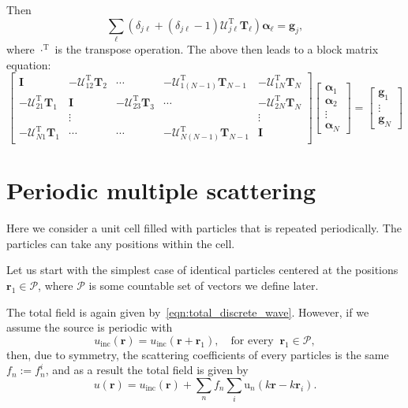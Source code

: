 \documentclass[ 12pt, a4paper]{article}
\renewcommand{\vec}[1]{\boldsymbol{#1}}
\begin{document}
 Then
\begin{equation}
 \sum_{\ell}(\delta_{j \ell} +  (\delta_{j \ell}-1) \vec {\mathcal U}_{j \ell}^{\mathrm T} \vec T_\ell) \vec \alpha_\ell  =  \vec g_j,
\end{equation}
where $\cdot ^{\mathrm T}$ is the transpose operation. The above then leads to a block matrix equation:
\begin{equation}
  \begin{bmatrix}
    \vec I & - \vec {\mathcal U}_{1 2}^{\mathrm T}\vec T_2 & \cdots & - \vec {\mathcal U}_{1 (N-1)}^{\mathrm T} \vec T_{N-1} & - \vec {\mathcal U}_{1 N}^{\mathrm T} \vec T_N \\
    - \vec {\mathcal U}_{2 1}^{\mathrm T} \vec T_1 & \vec I &  - \vec {\mathcal U}_{2 3}^{\mathrm T} \vec T_3 & \cdots & - \vec {\mathcal U}_{2 N}^{\mathrm T} \vec T_N \\
     & \vdots & & & \vdots \\
     - \vec {\mathcal U}_{N 1}^{\mathrm T} \vec T_1  & \cdots & \cdots & -  \vec {\mathcal U}_{N (N-1)}^{\mathrm T} \vec T_{N-1} & \vec I
  \end{bmatrix}
  \begin{bmatrix}
    \vec \alpha_1 \\
    \vec \alpha_2 \\
    \vdots \\
    \vec \alpha_N
  \end{bmatrix}
   = \begin{bmatrix}
     \vec g_1 \\
     \vdots \\
     \vec g_N
   \end{bmatrix}
\end{equation}

\section{Periodic multiple scattering}

Here we consider a unit cell filled with particles that is repeated periodically. The particles can take any positions within the cell.

Let us start with the simplest case of identical particles centered at the positions $\vec r_1 \in \mathcal P$, where $\mathcal P$ is some countable set of vectors we define later.

The total field is again given by~\eqref{eqn:total_discrete_wave}. However, if we assume the source is periodic with
\begin{equation}\label{eqn:incident-periodic}
  u_\mathrm{inc}(\vec r) = u_\mathrm{inc}(\vec r + \vec r_1), \quad \text{for every} \;\; \vec r_1 \in \mathcal P,
\end{equation}
then, due to symmetry, the scattering coefficients of every particles is the same $f_n := f^i_n$, and as a result the total field is given by
\[
u(\vec r) = u_\mathrm{inc}(\vec r) + \sum_n f_n \sum_{i} \mathrm u_n(k \vec r - k \vec r_i).
\]
\end{document}
